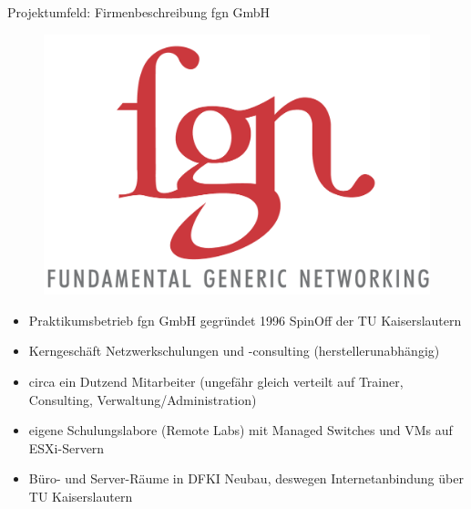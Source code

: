 \documentclass[handout,svgnames]{beamer}
\begin{document}
\subsection{}
\begin{frame}{Projektumfeld: Firmenbeschreibung fgn GmbH}
\begin{figure}[htbp] 
	\centering
	\includegraphics[scale=0.7]{Bilder/logo_fgn.png}
	\label{fig:fgn-Logo}
\end{figure}
\begin{itemize}
	\item Praktikumsbetrieb fgn GmbH gegründet 1996 SpinOff der TU Kaiserslautern
	\item Kerngeschäft Netzwerkschulungen und -consulting (herstellerunabhängig)
	\item circa ein Dutzend Mitarbeiter (ungefähr gleich verteilt auf Trainer, Consulting, Verwaltung/Administration)
	\item eigene Schulungslabore (Remote Labs) mit Managed Switches und VMs auf ESXi-Servern
	\item Büro- und Server-Räume in DFKI Neubau, deswegen Internetanbindung über TU Kaiserslautern
\end{itemize}
\end{frame}
\end{document}
